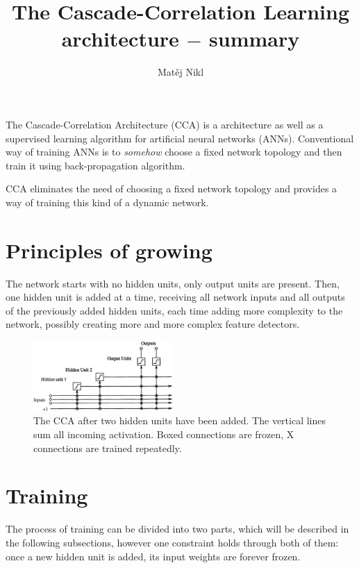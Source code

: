 \documentclass[a4paper,twocolumn]{article}
\title{The Cascade-Correlation Learning architecture $-$ summary}
\author{Matěj Nikl}
\begin{document}
\maketitle
The Cascade-Correlation Architecture (CCA) is a architecture as well as a supervised learning algorithm for artificial neural networks (ANNs). Conventional way of training ANNs is to \textit{somehow} choose a fixed network topology and then train it using back-propagation algorithm.

CCA eliminates the need of choosing a fixed network topology and provides a way of training this kind of a dynamic network.

\section{Principles of growing}
The network starts with no hidden units, only output units are present. Then, one hidden unit is added at a time, receiving all network inputs and all outputs of the previously added hidden units, each time adding more complexity to the network, possibly creating more and more complex feature detectors.

\begin{figure}[!h]
    \includegraphics[width=0.475\textwidth]{cascade.png}
    \caption{The CCA after two hidden units have been added. The vertical lines sum all incoming activation. Boxed connections are frozen, X connections are trained repeatedly.}
\end{figure}

\section{Training}
The process of training can be divided into two parts, which will be described in the following subsections, however one constraint holds through both of them: once a new hidden unit is added, its input weights are forever frozen.
\end{document}
